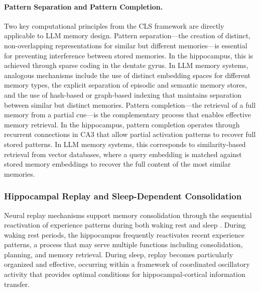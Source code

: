 \paragraph{Pattern Separation and Pattern Completion.} Two key computational principles from the CLS framework are directly applicable to LLM memory design. Pattern separation---the creation of distinct, non-overlapping representations for similar but different memories---is essential for preventing interference between stored memories. In the hippocampus, this is achieved through sparse coding in the dentate gyrus. In LLM memory systems, analogous mechanisms include the use of distinct embedding spaces for different memory types, the explicit separation of episodic and semantic memory stores, and the use of hash-based or graph-based indexing that maintains separation between similar but distinct memories. Pattern completion---the retrieval of a full memory from a partial cue---is the complementary process that enables effective memory retrieval. In the hippocampus, pattern completion operates through recurrent connections in CA3 that allow partial activation patterns to recover full stored patterns. In LLM memory systems, this corresponds to similarity-based retrieval from vector databases, where a query embedding is matched against stored memory embeddings to recover the full content of the most similar memories.

\subsubsection{Hippocampal Replay and Sleep-Dependent Consolidation}

Neural replay mechanisms support memory consolidation through the sequential reactivation of experience patterns during both waking rest and sleep \citep{carr2011hippocampal, foster2017replay}. During waking rest periods, the hippocampus frequently reactivates recent experience patterns, a process that may serve multiple functions including consolidation, planning, and memory retrieval. During sleep, replay becomes particularly organized and effective, occurring within a framework of coordinated oscillatory activity that provides optimal conditions for hippocampal-cortical information transfer.

